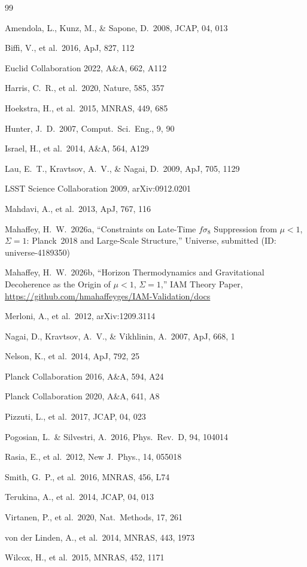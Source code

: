 \documentclass[12pt,a4paper]{article}
\begin{document}
\begin{thebibliography}{99}

 Amendola, L., Kunz, M., \& Sapone, D.\ 2008,
JCAP, 04, 013

 Biffi, V., et al.\ 2016, ApJ, 827, 112

 Euclid Collaboration 2022, A\&A, 662, A112

 Harris, C.\ R., et al.\ 2020, Nature, 585, 357

 Hoekstra, H., et al.\ 2015, MNRAS, 449, 685

 Hunter, J.\ D.\ 2007, Comput.\ Sci.\ Eng., 9, 90

 Israel, H., et al.\ 2014, A\&A, 564, A129

 Lau, E.\ T., Kravtsov, A.\ V., \& Nagai, D.\ 2009,
ApJ, 705, 1129

 LSST Science Collaboration 2009, arXiv:0912.0201

 Mahdavi, A., et al.\ 2013, ApJ, 767, 116

 Mahaffey, H.\ W.\ 2026a, ``Constraints on Late-Time
$f\sigma_8$ Suppression from $\mu < 1$, $\Sigma = 1$: Planck~2018 and
Large-Scale Structure,'' Universe, submitted (ID: universe-4189350)

 Mahaffey, H.\ W.\ 2026b, ``Horizon Thermodynamics
and Gravitational Decoherence as the Origin of $\mu < 1$, $\Sigma = 1$,''
IAM Theory Paper, \url{https://github.com/hmahaffeyges/IAM-Validation/docs}

 Merloni, A., et al.\ 2012, arXiv:1209.3114

 Nagai, D., Kravtsov, A.\ V., \& Vikhlinin, A.\ 2007,
ApJ, 668, 1

 Nelson, K., et al.\ 2014, ApJ, 792, 25

 Planck Collaboration 2016, A\&A, 594, A24

 Planck Collaboration 2020, A\&A, 641, A8

 Pizzuti, L., et al.\ 2017, JCAP, 04, 023

 Pogosian, L.\ \& Silvestri, A.\ 2016,
Phys.\ Rev.\ D, 94, 104014

 Rasia, E., et al.\ 2012, New J.\ Phys., 14, 055018

 Smith, G.\ P., et al.\ 2016, MNRAS, 456, L74

 Terukina, A., et al.\ 2014, JCAP, 04, 013

 Virtanen, P., et al.\ 2020, Nat.\ Methods, 17, 261

 von der Linden, A., et al.\ 2014, MNRAS, 443, 1973

 Wilcox, H., et al.\ 2015, MNRAS, 452, 1171

\end{thebibliography}
\end{document}
